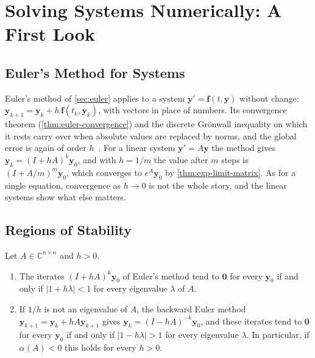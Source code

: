 \section{Solving Systems Numerically: A First Look}
\label{sec:systems-numerics}

\subsection{Euler's Method for Systems}

Euler's method of \cref{sec:euler} applies to a system $\mathbf y'=\mathbf f(t,\mathbf y)$ without change: $\mathbf y_{k+1}=\mathbf y_k+h\,\mathbf f(t_k,\mathbf y_k)$, with vectors in place of numbers. Its convergence theorem (\cref{thm:euler-convergence}) and the discrete Gr\"onwall inequality on which it rests carry over when absolute values are replaced by norms, and the global error is again of order $h$~\cite[Chap.~II]{hairer1993}. For a linear system $\mathbf y'=A\mathbf y$ the method gives $\mathbf y_k=(I+hA)^k\mathbf y_0$, and with $h=1/m$ the value after $m$ steps is $(I+A/m)^m\mathbf y_0$, which converges to $e^A\mathbf y_0$ by \cref{thm:exp-limit-matrix}. As for a single equation, convergence as $h\to0$ is not the whole story, and the linear systems show what else matters.

\subsection{Regions of Stability}

\begin{proposition}
\label{prop:euler-stability}
Let $A\in\mathbb C^{n\times n}$ and $h>0$.
\begin{enumerate}
\item The iterates $(I+hA)^k\mathbf y_0$ of Euler's method tend to $\mathbf 0$ for every $\mathbf y_0$ if and only if $|1+h\lambda|<1$ for every eigenvalue $\lambda$ of $A$.
\item If $1/h$ is not an eigenvalue of $A$, the backward Euler method $\mathbf y_{k+1}=\mathbf y_k+hA\mathbf y_{k+1}$ gives $\mathbf y_k=(I-hA)^{-k}\mathbf y_0$, and these iterates tend to $\mathbf 0$ for every $\mathbf y_0$ if and only if $|1-h\lambda|>1$ for every eigenvalue $\lambda$. In particular, if $\alpha(A)<0$ this holds for every $h>0$.
\end{enumerate}
\end{proposition}

